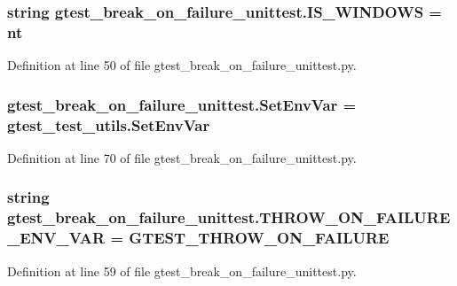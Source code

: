 \subsubsection[{\texorpdfstring{I\+S\+\_\+\+W\+I\+N\+D\+O\+WS}{IS_WINDOWS}}]{\setlength{\rightskip}{0pt plus 5cm}string gtest\+\_\+break\+\_\+on\+\_\+failure\+\_\+unittest.\+I\+S\+\_\+\+W\+I\+N\+D\+O\+WS = \textquotesingle{}nt\textquotesingle{}}\hypertarget{namespacegtest__break__on__failure__unittest_aec67fcd1a946db2d8c747f6519a5bb05}{}\label{namespacegtest__break__on__failure__unittest_aec67fcd1a946db2d8c747f6519a5bb05}


Definition at line 50 of file gtest\+\_\+break\+\_\+on\+\_\+failure\+\_\+unittest.\+py.

\subsubsection[{\texorpdfstring{Set\+Env\+Var}{SetEnvVar}}]{\setlength{\rightskip}{0pt plus 5cm}gtest\+\_\+break\+\_\+on\+\_\+failure\+\_\+unittest.\+Set\+Env\+Var = gtest\+\_\+test\+\_\+utils.\+Set\+Env\+Var}\hypertarget{namespacegtest__break__on__failure__unittest_a6d10069714f75f3f755c1d2c9c0ddd15}{}\label{namespacegtest__break__on__failure__unittest_a6d10069714f75f3f755c1d2c9c0ddd15}


Definition at line 70 of file gtest\+\_\+break\+\_\+on\+\_\+failure\+\_\+unittest.\+py.

\subsubsection[{\texorpdfstring{T\+H\+R\+O\+W\+\_\+\+O\+N\+\_\+\+F\+A\+I\+L\+U\+R\+E\+\_\+\+E\+N\+V\+\_\+\+V\+AR}{THROW_ON_FAILURE_ENV_VAR}}]{\setlength{\rightskip}{0pt plus 5cm}string gtest\+\_\+break\+\_\+on\+\_\+failure\+\_\+unittest.\+T\+H\+R\+O\+W\+\_\+\+O\+N\+\_\+\+F\+A\+I\+L\+U\+R\+E\+\_\+\+E\+N\+V\+\_\+\+V\+AR = \textquotesingle{}G\+T\+E\+S\+T\+\_\+\+T\+H\+R\+O\+W\+\_\+\+O\+N\+\_\+\+F\+A\+I\+L\+U\+RE\textquotesingle{}}\hypertarget{namespacegtest__break__on__failure__unittest_ac5edd000e7dc4212c8c7ce947ebd3b72}{}\label{namespacegtest__break__on__failure__unittest_ac5edd000e7dc4212c8c7ce947ebd3b72}


Definition at line 59 of file gtest\+\_\+break\+\_\+on\+\_\+failure\+\_\+unittest.\+py.

